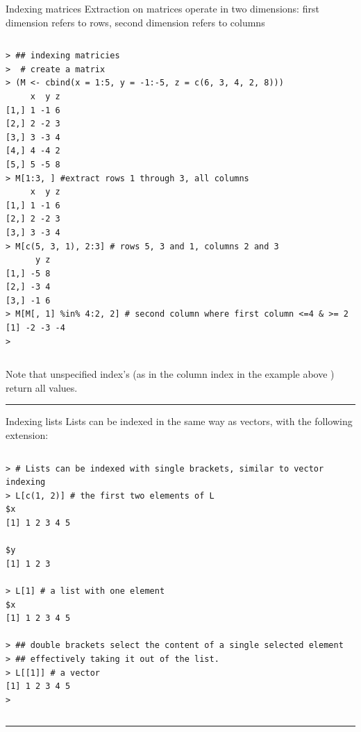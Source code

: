 \documentclass[table,smaller]{beamer}
\begin{document}
\begin{frame}[fragile,label=sec-3-3]{Indexing matrices}
 Extraction on matrices operate in two dimensions: first dimension refers to rows, second dimension refers to columns

\vspace{-.5em}
\begin{columns}
\begin{block}{}
\begin{verbatim}
> ## indexing matricies
>  # create a matrix
> (M <- cbind(x = 1:5, y = -1:-5, z = c(6, 3, 4, 2, 8)))
     x  y z
[1,] 1 -1 6
[2,] 2 -2 3
[3,] 3 -3 4
[4,] 4 -4 2
[5,] 5 -5 8
> M[1:3, ] #extract rows 1 through 3, all columns
     x  y z
[1,] 1 -1 6
[2,] 2 -2 3
[3,] 3 -3 4
> M[c(5, 3, 1), 2:3] # rows 5, 3 and 1, columns 2 and 3
      y z
[1,] -5 8
[2,] -3 4
[3,] -1 6
> M[M[, 1] %in% 4:2, 2] # second column where first column <=4 & >= 2
[1] -2 -3 -4
>
\end{verbatim}
\end{block}
\end{columns}
\vspace{.5em}

Note that unspecified index's (as in the column index in the example above ) return all values.

\rule{\linewidth}{0.5pt}
\end{frame}
\begin{frame}[fragile,label=sec-3-4]{Indexing lists}
 Lists can be indexed in the same way as vectors, with the following extension:
\vspace{-.5em}
\begin{columns}
\begin{block}{}
\begin{verbatim}
> # Lists can be indexed with single brackets, similar to vector indexing
> L[c(1, 2)] # the first two elements of L
$x
[1] 1 2 3 4 5

$y
[1] 1 2 3

> L[1] # a list with one element
$x
[1] 1 2 3 4 5

> ## double brackets select the content of a single selected element
> ## effectively taking it out of the list.
> L[[1]] # a vector
[1] 1 2 3 4 5
>
\end{verbatim}
\end{block}
\end{columns}
\vspace{.5em}

\rule{\linewidth}{0.5pt}
\end{frame}
\end{document}
